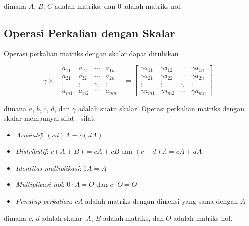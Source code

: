 \noindent
dimana $A$, $B$, $C$ adalah matriks, dan $0$ adalah matriks nol.

\subsection{Operasi Perkalian dengan Skalar}

Operasi perkalian matriks dengan skalar dapat dituliskan

\begin{equation}
  \label{eq:matrix_mult_scalar}\gamma \times
  \begin{bmatrix}
    a_{11} & a_{12} & \cdots & a_{1n} \\ a_{21}&a_{22}&\cdots&a_{2n}\\ \vdots&\vdots&\ddots&\vdots \\ a_{m1}&a_{m2}&\cdots&a_{mn}
  \end{bmatrix}
  =
  \begin{bmatrix}
    \gamma a_{11} & \gamma a_{12} & \cdots & \gamma a_{1n} \\ \gamma a_{21} & \gamma a_{22} & \cdots & \gamma a_{2n}\\ \vdots & \vdots & \ddots & \vdots \\ \gamma a_{m1} & \gamma a_{m2} & \cdots & \gamma a_{mn}
  \end{bmatrix}
\end{equation}

\noindent
dimana $a$, $b$, $c$, $d$, dan $\gamma$ adalah suatu skalar. Operasi perkalian matriks
dengan skalar mempunyai sifat - sifat:

\begin{itemize}
  \item \emph{Asosiatif}: $(cd) A = c (dA)$

  \item \emph{Distributif}: $c(A+B)=cA+cB$ dan $(c+d)A=cA+dA$

  \item \emph{Identitas multiplikasi}: $1 A = A$

  \item \emph{Multiplikasi nol}: $0\cdot A=O$ dan $c\cdot O= O$

  \item \emph{Penutup perkalian}: $cA$ adalah matriks dengan dimensi yang sama dengan
        $A$
\end{itemize}

\noindent
dimana $c$, $d$ adalah skalar, $A$, $B$ adalah matriks, dan $O$ adalah matriks
nol.


